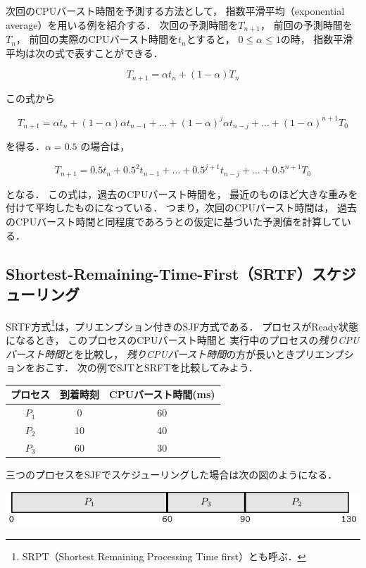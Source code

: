 次回のCPUバースト時間を予測する方法として，
指数平滑平均（exponential average）を用いる例を紹介する．
次回の予測時間を$T_{n+1}$，
前回の予測時間を$T_{n}$，
前回の実際のCPUバースト時間を$t_{n}$とすると，
$0 \le \alpha \le 1$の時，
指数平滑平均は次の式で表すことができる．

\[T_{n+1} = \alpha t_n + ( 1 - \alpha ) T_n\]

この式から

\[T_{n+1} = \alpha t_n + ( 1 - \alpha ) \alpha t_{n-1} + \dots +
( 1 - \alpha )^j \alpha t_{n-j} + \dots + (1 - \alpha )^{n+1} T_0 \]

を得る．$\alpha = 0.5$ の場合は，

\[T_{n+1} = 0.5 t_n + 0.5^2 t_{n-1} + \dots +
0.5^{j+1} t_{n-j} + \dots + 0.5^{n+1} T_0 \]

となる．
この式は，過去のCPUバースト時間を，
最近のものほど大きな重みを付けて平均したものになっている．
つまり，次回のCPUバースト時間は，
過去のCPUバースト時間と同程度であろうとの仮定に基づいた予測値を計算している．

\subsection{Shortest-Remaining-Time-First（SRTF）スケジューリング}
SRTF方式\footnote{
  SRPT（Shortest Remaining Processing Time first）とも呼ぶ．
}は，プリエンプション付きのSJF方式である．
プロセスがReady状態になるとき，
このプロセスのCPUバースト時間と
実行中のプロセスの\emph{残りCPUバースト時間}とを比較し，
\emph{残りCPUバースト時間}の方が長いときプリエンプションをおこす．
次の例でSJTとSRFTを比較してみよう．

\begin{center}
  \begin{tabular}{c c c}
    プロセス & 到着時刻 & CPUバースト時間(ms) \\
    \hline
    $P_1$    & 0  & 60 \\
    $P_2$    & 10 & 40 \\
    $P_3$    & 60 & 30 \\
  \end{tabular}
\end{center}

三つのプロセスをSJFでスケジューリングした場合は次の図のようになる．

\begin{center}
  \includegraphics[scale=1.0]{GanntChart/sjf2.pdf}
\end{center}

